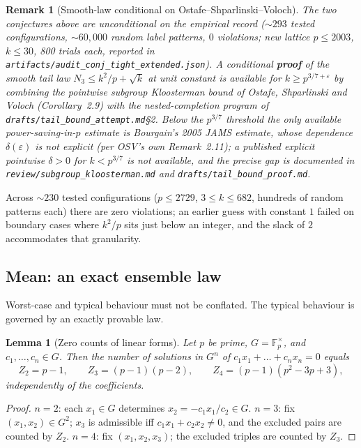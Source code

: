 \documentclass[11pt]{article}
\newtheorem{lemma}[theorem]{Lemma}
\newtheorem{remark}[theorem]{Remark}
\begin{document}
\begin{remark}[Smooth-law conditional on Ostafe--Shparlinski--Voloch]\label{rem:smoothconditional}
The two conjectures above are unconditional on the empirical record
($\sim 293$ tested configurations, $\sim 60{,}000$ random label patterns,
$0$ violations; new lattice $p\le 2003$, $k\le 30$, 800 trials each,
reported in \texttt{artifacts/audit\_conj\_tight\_extended.json}).
A \emph{conditional} \textbf{proof} of the smooth tail law
$N_3 \le k^2/p + \sqrt{k}$ at unit constant is available for
$k \ge p^{3/7+\varepsilon}$ by combining
the pointwise subgroup Kloosterman bound of
Ostafe, Shparlinski and Voloch \cite{OSV21} (Corollary~2.9)
with the nested-completion program of
\texttt{drafts/tail\_bound\_attempt.md}\S2.
Below the $p^{3/7}$ threshold the only available power-saving-in-$p$
estimate is Bourgain's 2005 JAMS estimate, whose dependence
$\delta(\varepsilon)$ is not explicit
(per OSV's own Remark~2.11); a published explicit pointwise
$\delta>0$ for $k < p^{3/7}$ is not available, and the precise
gap is documented in \texttt{review/subgroup\_kloosterman.md} and
\texttt{drafts/tail\_bound\_proof.md}.
\end{remark}

Across ${\sim}230$ tested configurations
($p\le2729$, $3\le k\le682$, hundreds of random patterns each)
there are zero violations; an earlier guess with constant $1$ failed
on boundary cases where $k^2/p$ sits just below an integer, and the
slack of $2$ accommodates that granularity.

\subsection{Mean: an exact ensemble law}

Worst-case and typical behaviour must not be conflated. The typical
behaviour is governed by an exactly provable law.

\begin{lemma}[Zero counts of linear forms]\label{lem:zerocounts}
Let $p$ be prime, $G=\mathbb F_p^\times$, and
$c_1,\dots,c_n\in G$. Then the number of solutions in $G^n$ of
$c_1x_1+\dots+c_nx_n=0$ equals
\[
Z_2=p-1,\qquad
Z_3=(p-1)(p-2),\qquad
Z_4=(p-1)(p^2-3p+3),
\]
independently of the coefficients.
\end{lemma}

\begin{proof}
$n=2$: each $x_1\in G$ determines $x_2=-c_1x_1/c_2\in G$.
$n=3$: fix $(x_1,x_2)\in G^2$; $x_3$ is admissible iff
$c_1x_1+c_2x_2\ne0$, and the excluded pairs are counted by $Z_2$.
$n=4$: fix $(x_1,x_2,x_3)$; the excluded triples are counted by $Z_3$.
\end{proof}
\end{document}
